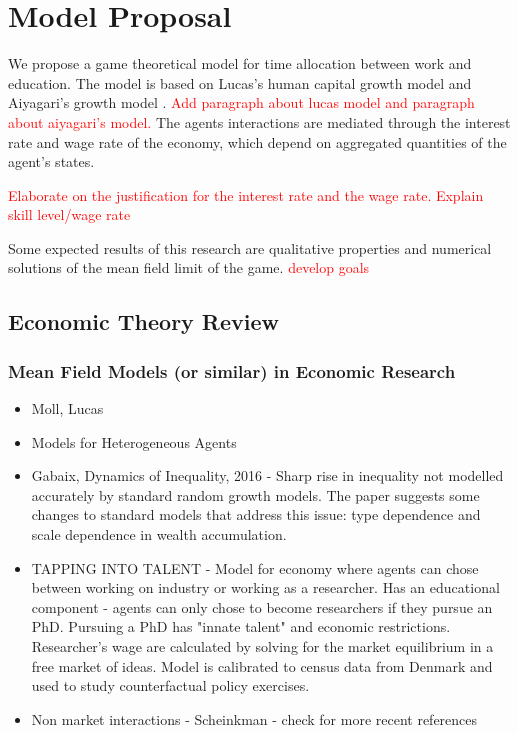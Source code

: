 \documentclass{article}
\begin{document}
\section{Model Proposal}\label{model_proposal}
We propose a game theoretical model for time allocation between work and education.
The model is based on Lucas's human capital growth model \cite{lucas1988mechanics} and Aiyagari’s growth model \cite{achdou2014partial,carmona2018probabilistic}.
\textcolor{red}{Add paragraph about lucas model and paragraph about aiyagari's model.}
The agents interactions are mediated through the interest rate and wage rate of the economy, which depend on aggregated quantities of the agent's states.

\textcolor{red}{Elaborate on the justification for the interest rate and the wage rate.
Explain skill level/wage rate}

Some expected results of this research are qualitative properties and numerical solutions of the mean field limit of the game. \textcolor{red}{develop goals}

\subsection{Economic Theory Review}\label{model_proposal:motivation}

\subsubsection{ Mean Field Models (or similar) in Economic Research}
\begin{itemize}
    \item Moll, Lucas
    \item Models for Heterogeneous Agents
    \item Gabaix, Dynamics of Inequality, 2016 - Sharp rise in inequality not modelled accurately by standard random growth models. The paper suggests some changes to standard models that address this issue: type dependence and scale dependence in wealth accumulation.
    \item TAPPING INTO TALENT - Model for economy where agents can chose between working on industry or working as a researcher. Has an educational component - agents can only chose to become researchers if they pursue an PhD. Pursuing a PhD has "innate talent" and economic restrictions. Researcher's wage are calculated by solving for the market equilibrium in a free market of ideas. Model is calibrated to census data from Denmark and used to study counterfactual policy exercises.
    \item Non market interactions - Scheinkman - check for more recent references
\end{itemize}
\end{document}
